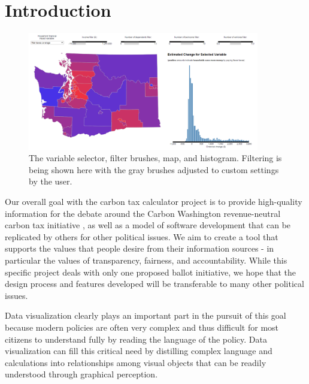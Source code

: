 \documentclass{sigchi}
\begin{document}



\section{Introduction}
\begin{figure}[t]
\centering
\includegraphics[width=0.9\textwidth]{summary}
\caption{The variable selector, filter brushes, map, and histogram. Filtering is being shown here with the gray brushes adjusted to custom settings by the user.}
\label{fig:summary}
\end{figure}
Our overall goal with the carbon tax calculator project is to provide high-quality information for the debate around the Carbon Washington revenue-neutral carbon tax initiative \cite{carbonWA}, as well as a model of software development that can be replicated by others for other political issues. We aim to create a tool that supports the values that people desire from their information sources - in particular the values of transparency, fairness, and accountability. While this specific project deals with only one proposed ballot initiative, we hope that the design process and features developed will be transferable to many other political issues.

Data visualization clearly plays an important part in the pursuit of this goal because modern policies are often very complex and thus difficult for most citizens to understand fully by reading the language of the policy. Data visualization can fill this critical need by distilling complex language and calculations into relationships among visual objects that can be readily understood through graphical perception. 
\end{document}
